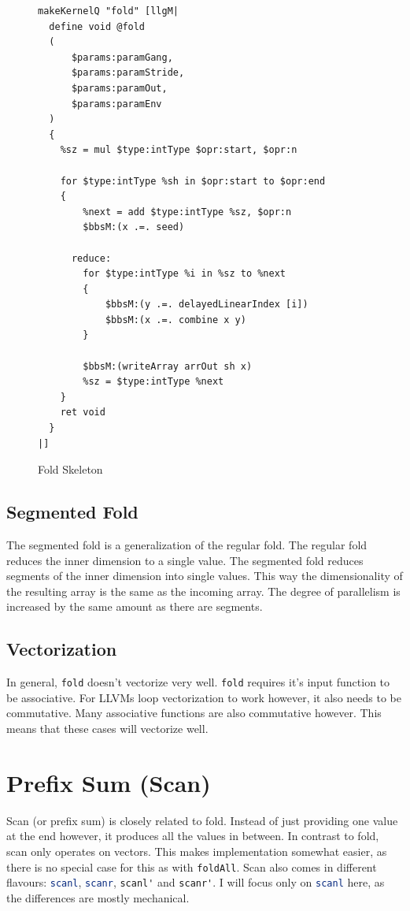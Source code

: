 \documentclass[a4paper,bibliography=totocnumbered,parskip,headsepline]{scrbook}
\begin{document}
\begin{figure}[h]
\begin{lstlisting}
makeKernelQ "fold" [llgM|
  define void @fold
  (
      $params:paramGang,
      $params:paramStride,
      $params:paramOut,
      $params:paramEnv
  )
  {
    %sz = mul $type:intType $opr:start, $opr:n

    for $type:intType %sh in $opr:start to $opr:end
    {
        %next = add $type:intType %sz, $opr:n
        $bbsM:(x .=. seed)

      reduce:
        for $type:intType %i in %sz to %next
        {
            $bbsM:(y .=. delayedLinearIndex [i])
            $bbsM:(x .=. combine x y)
        }

        $bbsM:(writeArray arrOut sh x)
        %sz = $type:intType %next
    }
    ret void
  }
|]
\end{lstlisting}
\caption{Fold Skeleton}
\label{fig:foldskel}
\end{figure}

\subsection{Segmented Fold}
The segmented fold is a generalization of the regular fold.
The regular fold reduces the inner dimension to a single value.
The segmented fold reduces segments of the inner dimension into single values.
This way the dimensionality of the resulting array is the same as the incoming array.
The degree of parallelism is increased by the same amount as there are segments.

\subsection*{Vectorization}
In general, \lstinline[language=haskell]!fold! doesn't vectorize very well.
\lstinline[language=haskell]!fold! requires it's input function to be associative.
For LLVMs loop vectorization to work however, it also needs to be commutative.
Many associative functions are also commutative however.
This means that these cases will vectorize well.

\section{Prefix Sum (Scan)}
Scan (or prefix sum) is closely related to fold.
Instead of just providing one value at the end however, it produces all the values in between.
In contrast to fold, scan only operates on vectors.
This makes implementation somewhat easier, as there is no special case for this as with \lstinline[language=haskell]!foldAll!.
Scan also comes in different flavours: \lstinline[language=haskell]!scanl!, \lstinline[language=haskell]!scanr!, \lstinline[language=haskell]!scanl'! and \lstinline[language=haskell]!scanr'!.
I will focus only on \lstinline[language=haskell]!scanl! here, as the differences are mostly mechanical.
\end{document}
